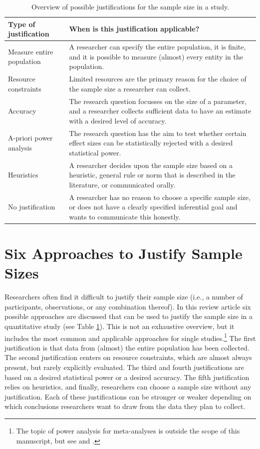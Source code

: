 \documentclass[
]{krantz}
\begin{document}
\begin{table}

\caption{\label{tab:table-pow-just}Overview of possible justifications for the sample size in a study.}
\centering
\begin{tabular}[t]{l|l}
\hline
Type of justification & When is this justification applicable?\\
\hline
Measure entire population & A researcher can specify the entire population, it is finite, and it is possible to measure (almost) every entity in the population.\\
\hline
Resource constraints & Limited resources are the primary reason for the choice of the sample size a researcher can collect.\\
\hline
Accuracy & The research question focusses on the size of a parameter, and a researcher collects sufficient data to have an estimate with a desired level of accuracy.\\
\hline
A-priori power analysis & The research question has the aim to test whether certain effect sizes can be statistically rejected with a desired statistical power.\\
\hline
Heuristics & A researcher decides upon the sample size based on a heuristic, general rule or norm that is described in the literature, or communicated orally.\\
\hline
No justification & A researcher has no reason to choose a specific sample size, or does not have a clearly specified inferential goal and wants to communicate this honestly.\\
\hline
\end{tabular}
\end{table}

\hypertarget{six-approaches-to-justify-sample-sizes}{%
\section{Six Approaches to Justify Sample Sizes}\label{six-approaches-to-justify-sample-sizes}}

Researchers often find it difficult to justify their sample size (i.e., a number of participants, observations, or any combination thereof). In this review article six possible approaches are discussed that can be used to justify the sample size in a quantitative study (see Table \ref{tab:table-pow-just}). This is not an exhaustive overview, but it includes the most common and applicable approaches for single studies.\footnote{The topic of power analysis for meta-analyses is outside the scope of this manuscript, but see \citet{hedges_power_2001} and \citet{valentine_how_2010}.} The first justification is that data from (almost) the entire population has been collected. The second justification centers on resource constraints, which are almost always present, but rarely explicitly evaluated. The third and fourth justifications are based on a desired statistical power or a desired accuracy. The fifth justification relies on heuristics, and finally, researchers can choose a sample size without any justification. Each of these justifications can be stronger or weaker depending on which conclusions researchers want to draw from the data they plan to collect.
\end{document}

